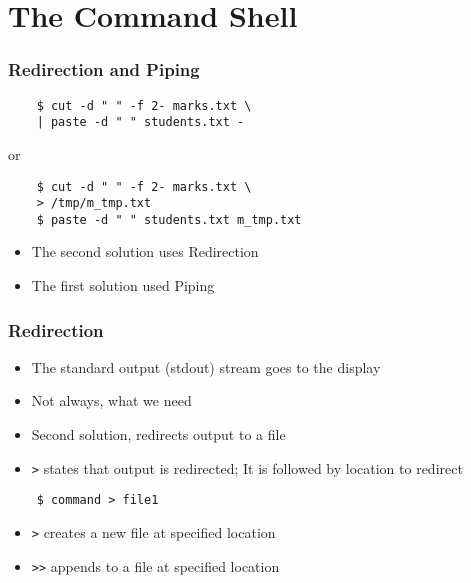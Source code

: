 \documentclass[12pt,compress]{beamer}
\begin{document}
\section{The Command Shell}

\begin{frame}[fragile]
  \frametitle{Redirection and Piping}
  \begin{lstlisting}
    $ cut -d " " -f 2- marks.txt \
    | paste -d " " students.txt -
  \end{lstlisting} %

  or

  \begin{lstlisting}
    $ cut -d " " -f 2- marks.txt \
    > /tmp/m_tmp.txt
    $ paste -d " " students.txt m_tmp.txt
  \end{lstlisting} %

  \begin{itemize}
  \item The second solution uses Redirection
  \item The first solution used Piping
  \end{itemize}
\end{frame}

\begin{frame}[fragile]
  \frametitle{Redirection} 

  \begin{itemize}
  \item The standard output (stdout) stream goes to the display
  \item Not always, what we need
  \item Second solution, redirects output to a file
  \item \texttt{>} states that output is redirected; It is
    followed by location to redirect
  \end{itemize}
  \begin{lstlisting}
    $ command > file1
  \end{lstlisting} %
  \begin{itemize}
  \item \texttt{>} creates a new file at specified location
  \item \texttt{>>} appends to a file at specified location
  \end{itemize}
\end{frame}
\end{document}
